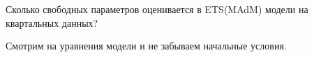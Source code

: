 
\begin{question}
Сколько свободных параметров оценивается в ETS(MAdM) модели на квартальных данных?
\end{question}

\begin{solution}
Смотрим на уравнения модели и не забываем начальные условия.
\end{solution}

